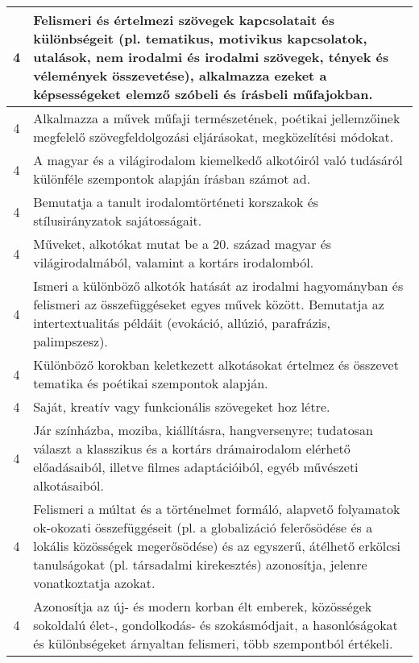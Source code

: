 \begin{longtable}{c | p{12cm} }
                                          4 &  Felismeri és értelmezi szövegek kapcsolatait és különbségeit (pl. tematikus, motivikus kapcsolatok, utalások, nem irodalmi és irodalmi szövegek, tények és vélemények összevetése), alkalmazza ezeket a képsességeket elemző szóbeli és írásbeli műfajokban. \\ \hline
                                          4 &  Alkalmazza a művek műfaji természetének, poétikai jellemzőinek megfelelő szövegfeldolgozási eljárásokat, megközelítési módokat. \\ \hline
                                          4 &  A magyar és a világirodalom kiemelkedő alkotóiról való tudásáról különféle szempontok alapján írásban számot ad.
 \\ \hline
                                          4 &  Bemutatja a tanult irodalomtörténeti korszakok és stílusirányzatok sajátosságait. \\ \hline
                                          4 &  Műveket, alkotókat mutat be a 20. század magyar és világirodalmából, valamint a kortárs irodalomból. \\ \hline
                                          4 &  Ismeri a különböző alkotók hatását az irodalmi hagyományban és felismeri az összefüggéseket egyes művek között. Bemutatja az intertextualitás példáit (evokáció, allúzió, parafrázis, palimpszesz). \\ \hline
                                          4 &  Különböző korokban keletkezett alkotásokat értelmez és összevet tematika és poétikai szempontok alapján. \\ \hline
                                          4 &  Saját, kreatív vagy funkcionális szövegeket hoz létre. \\ \hline
                                          4 &  Jár színházba, moziba, kiállításra, hangversenyre; tudatosan választ a klasszikus és a kortárs drámairodalom elérhető előadásaiból, illetve filmes adaptációiból, egyéb művészeti alkotásaiból. \\ \hline
                                          4 &  Felismeri a múltat és a történelmet formáló, alapvető folyamatok ok-okozati összefüggéseit (pl. a globalizáció felerősödése és a lokális közösségek megerősödése) és az egyszerű, átélhető erkölcsi tanulságokat (pl. társadalmi kirekesztés) azonosítja, jelenre vonatkoztatja azokat. \\ \hline
                                          4 &  Azonosítja az új- és modern korban élt emberek, közösségek sokoldalú élet-, gondolkodás- és szokásmódjait, a hasonlóságokat és különbségeket árnyaltan felismeri, több szempontból értékeli. \\ \hline

\end{longtable}
